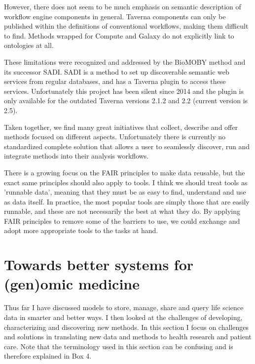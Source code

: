 However, there does not seem to be much emphasis on semantic description of workflow engine components in general.
Taverna components can only be published within the definitions of conventional workflows, making them difficult to find.
Methods wrapped for Compute and Galaxy do not explicitly link to ontologies at all.

These limitations were recognized and addressed by the BioMOBY method and its successor SADI\cite{Wilkinson_2010,Withers_2010}.
SADI is a method to set up discoverable semantic web services from regular databases, and has a Taverna plugin to access these services.
Unfortunately this project has been silent since 2014 and the plugin is only available for the outdated Taverna versions 2.1.2 and 2.2 (current version is 2.5).

Taken together, we find many great initiatives that collect, describe and offer methods focused on different aspects.
Unfortunately there is currently no standardized complete solution that allows a user to seamlessly discover, run and integrate methods into their analysis workflows.

There is a growing focus on the FAIR principles to make data reusable, but the exact same principles should also apply to tools.
I think we should treat tools as 'runnable data', meaning that they must be as easy to find, understand and use as data itself.
In practice, the most popular tools are simply those that are easily runnable, and these are not necessarily the best at what they do.
By applying FAIR principles to remove some of the barriers to use, we could exchange and adopt more appropriate tools to the tasks at hand.


\section{Towards better systems for (gen)omic medicine} \label{systemsection}

Thus far I have discussed models to store, manage, share and query life science data in smarter and better ways.
I then looked at the challenges of developing, characterizing and discovering new methods.
In this section I focus on challenges and solutions in translating new data and methods to health research and patient care.
Note that the terminology used in this section can be confusing and is therefore explained in Box 4.

